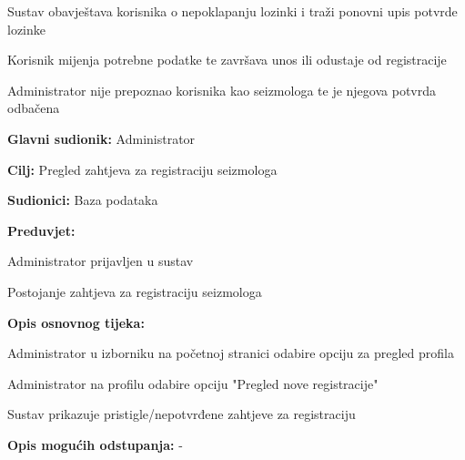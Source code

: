 \begin{packed_item}
\begin{packed_item}
\begin{packed_enum}
								\item Sustav obavještava korisnika o nepoklapanju lozinki i traži ponovni upis potvrde lozinke
								\item Korisnik mijenja potrebne podatke te završava unos ili odustaje od registracije
								
							\end{packed_enum} 
							\item[4.a] Administrator nije prepoznao korisnika kao seizmologa te je njegova potvrda odbačena
							
						\end{packed_item}
					\end{packed_item}

					\noindent {}
					\begin{packed_item}
	
						\item \textbf{Glavni sudionik:} Administrator
						\item \textbf{Cilj:} Pregled zahtjeva za registraciju seizmologa
						\item \textbf{Sudionici:} Baza podataka
						\item \textbf{Preduvjet:} 
							\begin{packed_item}
								\item Administrator prijavljen u sustav
								\item Postojanje zahtjeva za registraciju seizmologa
							\end{packed_item}
						\item  \textbf{Opis osnovnog tijeka:}
						
						\item[] \begin{packed_enum}
	
							\item Administrator u izborniku na početnoj stranici odabire opciju za pregled profila
							\item Administrator na profilu odabire opciju "Pregled nove registracije"
							\item Sustav prikazuje pristigle/nepotvrđene zahtjeve za registraciju 

						\end{packed_enum}
						
						\item  \textbf{Opis mogućih odstupanja:} -
						
					\end{packed_item}

